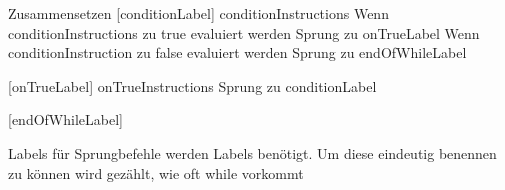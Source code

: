 Zusammensetzen
	[conditionLabel]
	conditionInstructions
		Wenn conditionInstructions zu true evaluiert werden
			Sprung zu onTrueLabel
		Wenn conditionInstruction zu false evaluiert werden
			Sprung zu endOfWhileLabel
	
	[onTrueLabel]
	onTrueInstructions
	Sprung zu conditionLabel	
			
	[endOfWhileLabel]

Labels
	für Sprungbefehle werden Labels benötigt. Um diese eindeutig benennen zu können wird gezählt, wie oft while vorkommt

